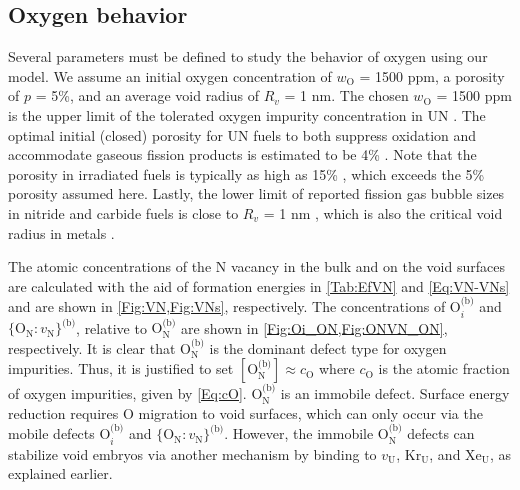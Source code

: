 \documentclass[preprint,12pt,sort&compress]{elsarticle}
\newcommand{\?}{\stackrel{?}{=}}
\begin{document}
\subsection{Oxygen behavior}
\label{Sec:Oxygen}

Several parameters must be defined to study the behavior of oxygen using our model. We assume an initial oxygen concentration of $w_\text{O}$ = 1500 ppm, a porosity of $p$ = 5\%, and an average void radius of $R_v$ = 1 nm. The chosen $w_\text{O}$ = 1500 ppm is the upper limit of the tolerated oxygen impurity concentration in UN \cite{Rogozkin2003, Schuler2017}. The optimal initial (closed) porosity for UN fuels to both suppress oxidation and accommodate gaseous fission products is estimated to be 4\% \cite{Johnson2018}. Note that the porosity in irradiated fuels is typically as high as 15\% \cite{Nichenko2014}, which exceeds the 5\% porosity assumed here. Lastly, the lower limit of reported fission gas bubble sizes in nitride and carbide fuels is close to $R_v$ = 1 nm \cite{Matzke1986}, which is also the critical void radius in metals \cite{Zinkle1987b}.

The atomic concentrations of the N vacancy in the bulk and on the void surfaces are calculated with the aid of formation energies in \cref{Tab:EfVN} and \cref{Eq:VN-VNs} and are shown in \cref{Fig:VN,Fig:VNs}, respectively. The concentrations of $\text{O}_i^\text{(b)}$ and $\{\text{O}_\text{N} \! : \! v_\text{N}\}^\text{(b)}$, relative to $\text{O}_\text{N}^\text{(b)}$ are shown in \cref{Fig:Oi_ON,Fig:ONVN_ON}, respectively. It is clear that $\text{O}_\text{N}^\text{(b)}$ is the dominant defect type for oxygen impurities. Thus, it is justified to set $[ \text{O}_\text{N}^\text{(b)} ] \approx c_\text{O}$ where $c_\text{O}$ is the atomic fraction of oxygen impurities, given by \cref{Eq:cO}. $\text{O}_\text{N}^\text{(b)}$ is an immobile defect. Surface energy reduction requires O migration to void surfaces, which can only occur via the mobile defects $\text{O}_i^\text{(b)}$ and $\{\text{O}_\text{N} \! : \! v_\text{N}\}^\text{(b)}$. However, the immobile $\text{O}_\text{N}^\text{(b)}$ defects can stabilize void embryos via another mechanism by binding to $v_\text{U}$, $\text{Kr}_\text{U}$, and $\text{Xe}_\text{U}$, as explained earlier.
 
\end{document}
